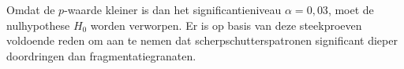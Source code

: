 \begin{enumerate}[label=(\alph*)]
{            Omdat de $p$-waarde kleiner is dan het significantieniveau $\alpha = 0,03$, moet de nulhypothese $H_0$ worden verworpen.
            Er is op basis van deze steekproeven voldoende reden om aan te nemen dat scherpschutterspatronen significant dieper doordringen dan fragmentatiegranaten.
            \begin{center}
            \end{center}
        }    
    
    \end{enumerate}